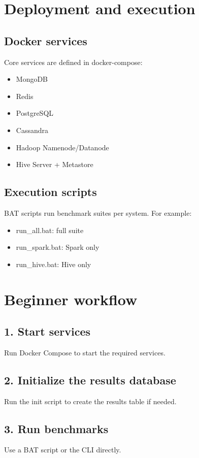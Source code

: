 \documentclass[12pt]{report}
\begin{document}
\chapter{Deployment and execution}
\section{Docker services}
Core services are defined in docker-compose:
\begin{itemize}
  \item MongoDB
  \item Redis
  \item PostgreSQL
  \item Cassandra
  \item Hadoop Namenode/Datanode
  \item Hive Server + Metastore
\end{itemize}

\section{Execution scripts}
BAT scripts run benchmark suites per system. For example:
\begin{itemize}
  \item run\_all.bat: full suite
  \item run\_spark.bat: Spark only
  \item run\_hive.bat: Hive only
\end{itemize}

\chapter{Beginner workflow}
\section{1. Start services}
Run Docker Compose to start the required services.

\section{2. Initialize the results database}
Run the init script to create the results table if needed.

\section{3. Run benchmarks}
Use a BAT script or the CLI directly.
\end{document}
